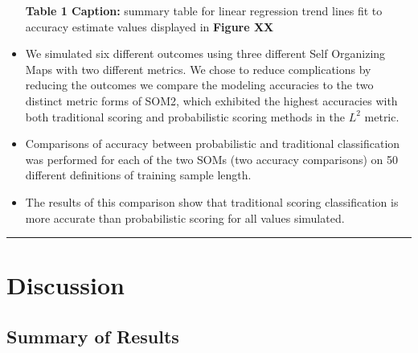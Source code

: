 \documentclass[12pt,]{article}
\begin{document}
\begin{itemize}
  \textbf{Table 1 Caption:} summary table for linear regression trend
  lines fit to accuracy estimate values displayed in \textbf{Figure XX}
\item
  We simulated six different outcomes using three different Self
  Organizing Maps with two different metrics. We chose to reduce
  complications by reducing the outcomes we compare the modeling
  accuracies to the two distinct metric forms of SOM2, which exhibited
  the highest accuracies with both traditional scoring and probabilistic
  scoring methods in the \(L^{2}\) metric.
\item
  Comparisons of accuracy between probabilistic and traditional
  classification was performed for each of the two SOMs (two accuracy
  comparisons) on 50 different definitions of training sample length.
\item
  The results of this comparison show that traditional scoring
  classification is more accurate than probabilistic scoring for all
  values simulated.
\end{itemize}

\begin{center}\rule{0.5\linewidth}{\linethickness}\end{center}

\hypertarget{discussion}{%
\section{Discussion}\label{discussion}}

\hypertarget{summary-of-results}{%
\subsection{Summary of Results}\label{summary-of-results}}
\end{document}

